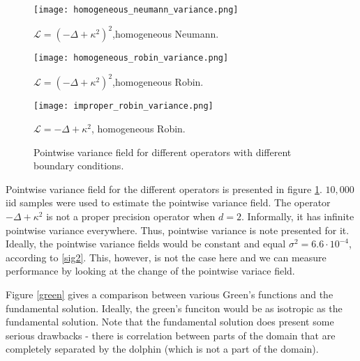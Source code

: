 \documentclass[paper=a4, fontsize=11pt]{scrartcl} %
\numberwithin{equation}{section} %
\numberwithin{figure}{section} %
\numberwithin{table}{section} %
\newcommand{\Op}{\mathcal{L}}
\begin{document}
\begin{figure}[!htb]
  \texttt{[image: homogeneous\_neumann\_variance.png]}
   \caption*{$\Op = (-\Delta + \kappa^2)^2$,\newline homogeneous Neumann.}
\endminipage\hfill
{}
  \texttt{[image: homogeneous\_robin\_variance.png]}
   \caption*{$\Op = (-\Delta + \kappa^2)^2$,\newline homogeneous Robin.}
\endminipage\hfill
{}
  \texttt{[image: improper\_robin\_variance.png]}
   \caption*{$\Op = -\Delta + \kappa^2$, \newline homogeneous Robin.}
\endminipage
 \caption{Pointwise variance field for different operators with
   different boundary conditions.}
 \label{var}
\end{figure}
  
Pointwise variance field for the different operators is presented in figure \ref{var}.
$10,000$ iid samples were used to estimate the pointwise variance field. 
The operator $-\Delta + \kappa^2$ is not a proper precision operator when $d=2$. 
Informally, it has infinite pointwise variance everywhere. Thus, pointwise
variance is note presented for it. Ideally, the pointwise
variance fields would be constant and equal 
$\sigma^2 = 6.6 \cdot 10^{-4}$, according to \ref{sig2}. This, 
however, is not the case here and we can measure performance
by looking at the change of the pointwise variace field.

Figure \ref{green} gives a comparison between various Green's functions
and the fundamental solution. Ideally, the green's funciton would be as
isotropic as the fundamental solution. Note that the fundamental solution
does present some serious drawbacks - there is correlation between parts of
the domain that are completely separated by the dolphin (which is not
a part of the domain).





\end{document}
